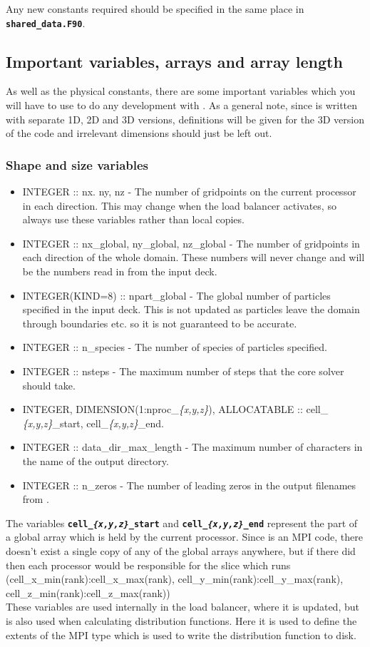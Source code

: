 \documentclass[12pt,a4paper]{article}
\newcommand{\inlinecode}[1]{{\color{warwickred} \bf\texttt{#1}}}
\newcommand{\EPOCH}{{\color{warwickdark}\fontfamily{phv}\selectfont{EPOCH}}}
\begin{document}
Any new constants required should be specified in the same place in
\inlinecode{shared\_data.F90}.

\subsection{Important variables, arrays and array length}
As well as the physical constants, there are some important variables which
you will have to use to do any development with {\EPOCH}. As a general note,
since {\EPOCH} is written with separate 1D, 2D and 3D versions, definitions will
be given for the 3D version of the code and irrelevant dimensions should just
be left out.

\subsubsection{Shape and size variables}
\begin{itemize}
\item INTEGER :: nx. ny, nz - The number of gridpoints on the current
  processor in each direction. This may change when the load balancer
  activates, so always use these variables rather than local copies.
\item INTEGER :: nx\_global, ny\_global, nz\_global - The number of gridpoints
  in each direction of the whole domain. These numbers will never change and
  will be the numbers read in from the input deck.
\item INTEGER(KIND=8) :: npart\_global - The global number of particles
  specified in the input deck. This is not updated as particles leave the
  domain through boundaries etc. so it is not guaranteed to be accurate.
\item INTEGER :: n\_species - The number of species of particles specified.
\item INTEGER :: nsteps - The maximum number of steps that the core solver
  should take.
\item INTEGER, DIMENSION(1:nproc\_{\it \{x,y,z\}}), ALLOCATABLE :: cell\_{\it
    \{x,y,z\}}\_start, cell\_{\it \{x,y,z\}}\_end.
\item INTEGER :: data\_dir\_max\_length - The maximum number of characters in
  the name of the output directory.
\item INTEGER :: n\_zeros - The number of leading zeros in the output filenames
  from {\EPOCH}.
\end{itemize}
The variables \inlinecode{cell\_{\it \{x,y,z\}}\_start} and
\inlinecode{cell\_{\it \{x,y,z\}}\_end} represent the part of a global array
which is held by the current processor. Since {\EPOCH} is an MPI code, there
doesn't exist a single copy of any of the global arrays anywhere, but if there
did then each processor would be responsible for the slice which runs\\
(cell\_x\_min(rank):cell\_x\_max(rank),
cell\_y\_min(rank):cell\_y\_max(rank),
cell\_z\_min(rank):cell\_z\_max(rank))\\
These variables are used internally in the load balancer, where it is updated,
but is also used when calculating distribution functions. Here it is used to
define the extents of the MPI type which is used to write the distribution
function to disk.
\end{document}
